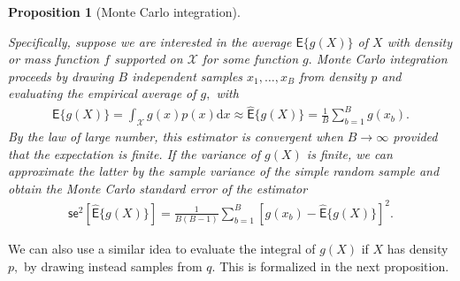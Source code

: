 \documentclass[
  11pt,
  letterpaper,
]{scrbook}
\theoremstyle{definition}
\theoremstyle{plain}
\newtheorem{proposition}{Proposition}[chapter]
\theoremstyle{plain}
\theoremstyle{plain}
\theoremstyle{definition}
\theoremstyle{definition}
\theoremstyle{plain}
\newtheorem{proposition}{Proposition}[chapter]
\theoremstyle{plain}
\theoremstyle{remark}
\begin{document}
\begin{proposition}[Monte Carlo
integration]\protect\hypertarget{prp-monte-carlo-integration}{}\label{prp-monte-carlo-integration}

Specifically, suppose we are interested in the average
\(\mathsf{E}\{g(X)\}\) of \(X\) with density or mass function \(f\)
supported on \(\mathcal{X}\) for some function \(g.\) Monte Carlo
integration proceeds by drawing \(B\) independent samples
\(x_1, \ldots, x_B\) from density \(p\) and evaluating the empirical
average of \(g,\) with \begin{align*}
\mathsf{E}\{g(X)\} = \int_{\mathcal{X}} g(x) p(x) \mathrm{d} x \approx \widehat{\mathsf{E}}\{g(X)\}=\frac{1}{B}\sum_{b=1}^B g(x_b).
\end{align*} By the law of large number, this estimator is convergent
when \(B \to \infty\) provided that the expectation is finite. If the
variance of \(g(X)\) is finite, we can approximate the latter by the
sample variance of the simple random sample and obtain the Monte Carlo
standard error of the estimator \begin{align*}
\mathsf{se}^2[\widehat{\mathsf{E}}\{g(X)\}] = \frac{1}{B(B-1)} \sum_{b=1}^B \left[ g(x_b) -  \widehat{\mathsf{E}}\{g(X)\} \right]^2.
\end{align*}

\end{proposition}

We can also use a similar idea to evaluate the integral of \(g(X)\) if
\(X\) has density \(p,\) by drawing instead samples from \(q.\) This is
formalized in the next proposition.
\end{document}
